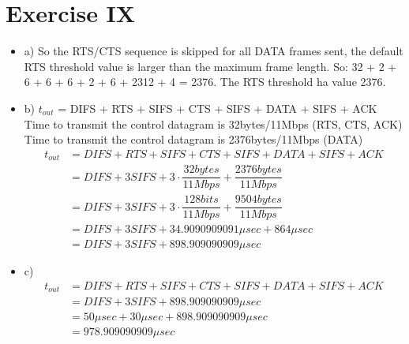 \documentclass[11pt]{article}
\begin{document}
	\section*{Exercise IX}
	\begin{itemize}
		\item{a)} So the RTS/CTS sequence is skipped for all DATA frames sent, the default RTS threshold value is larger than the maximum frame length. So:
		32 + 2 + 6 + 6 + 6 + 2 + 6 + 2312 + 4 = 2376. The RTS threshold ha value 2376.
		\item{b)} 
		$t_{out}$ = DIFS + RTS + SIFS + CTS + SIFS + DATA + SIFS + ACK \\
		Time to transmit the control datagram is 32bytes/11Mbps (RTS, CTS, ACK)\\
		Time to transmit the control datagram is 2376bytes/11Mbps (DATA)\\
		$$
		\begin{aligned}
			t_{out} &= DIFS + RTS + SIFS + CTS + SIFS + DATA + SIFS + ACK \\
			&= DIFS + 3 SIFS + 3 \cdot \dfrac{32 bytes}{11 Mbps} + \dfrac{2376 bytes}{11 Mbps}\\
			&= DIFS + 3 SIFS + 3 \cdot \dfrac{128 bits}{11 Mbps} + \dfrac{9504 bytes}{11 Mbps}\\
			&= DIFS + 3 SIFS + 34.9090909091 \mu sec + 864 \mu sec\\
			&= DIFS + 3 SIFS + 898.909090909 \mu sec
		\end{aligned}
		$$
		\item{c)} 
		$$
		\begin{aligned}
			t_{out} &= DIFS + RTS + SIFS + CTS + SIFS + DATA + SIFS + ACK \\
			&= DIFS + 3 SIFS + 898.909090909 \mu sec \\
			&= 50 \mu sec + 30 \mu sec + 898.909090909 \mu sec\\
			&= 978.909090909 \mu sec
		\end{aligned}
		$$
	\end{itemize}
\end{document}
